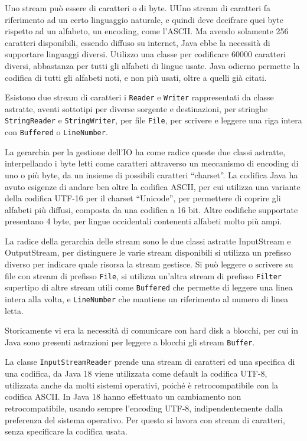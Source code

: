 \documentclass{article}
\numberwithin{equation}{subsection}
\begin{document}
Uno stream può essere di caratteri o di byte. UUno stream di caratteri fa riferimento ad un certo linguaggio naturale, e quindi deve decifrare quei byte rispetto ad un alfabeto, 
un encoding, come l'ASCII. Ma avendo solamente 256 caratteri disponibili, essendo diffuso su internet, Java ebbe la necessità di supportare linguaggi diversi. Utilizzo una classe 
per codificare 60000 caratteri diversi, abbastanza per tutti gli alfabeti di lingue usate. Java odierno permette la codifica di tutti gli alfabeti noti, e non più usati, oltre 
a quelli già citati. 

Esistono due stream di caratteri i \verb|Reader| e \verb|Writer| rappresentati da classe astratte, aventi sottotipi per diverse sorgente e destinazioni, per stringhe 
\verb|StringReader| e \verb|StringWriter|, per file \verb|File|, per scrivere e leggere una riga intera con \verb|Buffered| o \verb|LineNumber|. 

La gerarchia per la gestione dell'IO ha come radice queste due classi astratte, interpellando i byte letti come caratteri attraverso un meccanismo di encoding di uno o più byte, 
da un insieme di possibili caratteri ``charset''. 
La codifica Java ha avuto esigenze di andare ben oltre la codifica ASCII, per cui utilizza una variante della codifica UTF-16 per il charset ``Unicode'', per permettere di 
coprire gli alfabeti più diffusi, composta da una codifica a 16 bit. 
Altre codifiche supportate presentano 4 byte, per lingue occidentali contenenti alfabeti molto più ampi. 


La radice della gerarchia delle stream sono le due classi astratte InputStream e OutputStream, per distinguere le varie stream disponibili si utilizza un prefisso diverso per indicare 
quale risorsa la stream gestisce. Si può leggere o scrivere su file con stream di prefisso \verb|File|, si utilizza un'altra stream di prefisso \verb|Filter| supertipo 
di altre stream utili come \verb|Buffered| che permette di leggere una linea intera alla volta, e \verb|LineNumber| che mantiene un riferimento al numero di linea letta.   

Storicamente vi era la necessità di comunicare con hard disk a blocchi, per cui in Java sono presenti astrazioni per leggere a blocchi gli stream \verb|Buffer|. 

La classe \verb|InputStreamReader| prende una stream di caratteri ed una specifica di una codifica, da Java 18 viene utilizzata come default la codifica UTF-8, utilizzata 
anche da molti sistemi operativi, poiché è retrocompatibile con la codifica ASCII. In Java 18 hanno effettuato un cambiamento non retrocompatibile, usando sempre l'encoding 
UTF-8, indipendentemente dalla preferenza del sistema operativo. Per questo si lavora con stream di caratteri, senza specificare la codifica usata. 
\end{document}
